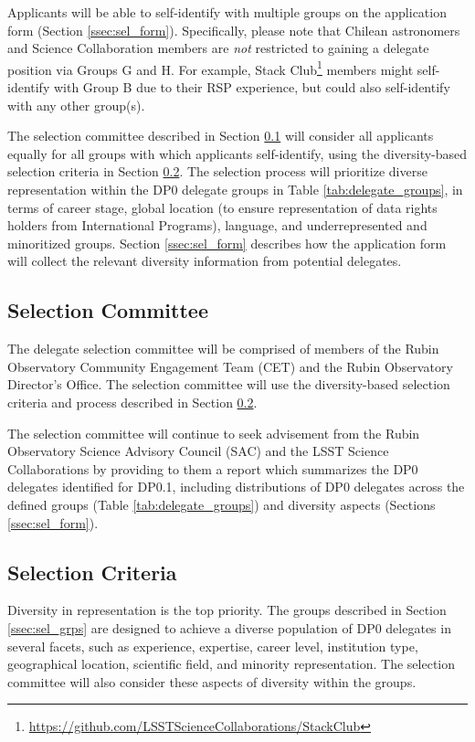 \documentclass[DM,lsstdraft,authoryear,toc]{lsstdoc}
\begin{document}
Applicants will be able to self-identify with multiple groups on the application form (Section \ref{ssec:sel_form}).
Specifically, please note that Chilean astronomers and Science Collaboration members are {\it not} restricted to gaining a delegate position via Groups G and H. 
For example, Stack Club\footnote{\url{https://github.com/LSSTScienceCollaborations/StackClub}} members might self-identify with Group B due to their RSP experience, but could also self-identify with any other group(s).

The selection committee described in Section \ref{ssec:sel_comm} will consider all applicants equally for all groups with which applicants self-identify, using the diversity-based selection criteria in Section \ref{ssec:sel_crit}.
The selection process will prioritize diverse representation within the DP0 delegate groups in Table \ref{tab:delegate_groups}, in terms of career stage, global location (to ensure representation of data rights holders from International Programs), language, and underrepresented and minoritized groups.
Section \ref{ssec:sel_form} describes how the application form will collect the relevant diversity information from potential delegates.

\subsection{Selection Committee}\label{ssec:sel_comm}

The delegate selection committee will be comprised of members of the Rubin Observatory Community Engagement Team (CET) and the Rubin Observatory Director's Office.
The selection committee will use the diversity-based selection criteria and process described in Section \ref{ssec:sel_crit}.

The selection committee will continue to seek advisement from the Rubin Observatory Science Advisory Council (SAC) and the LSST Science Collaborations by providing to them a report which summarizes the DP0 delegates identified for DP0.1, including distributions of DP0 delegates across the defined groups (Table \ref{tab:delegate_groups}) and diversity aspects (Sections \ref{ssec:sel_form}).

\subsection{Selection Criteria}\label{ssec:sel_crit}

Diversity in representation is the top priority.
The groups described in Section \ref{ssec:sel_grps} are designed to achieve a diverse population of DP0 delegates in several facets, such as experience, expertise, career level, institution type, geographical location, scientific field, and minority representation.
The selection committee will also consider these aspects of diversity within the groups.
\end{document}
